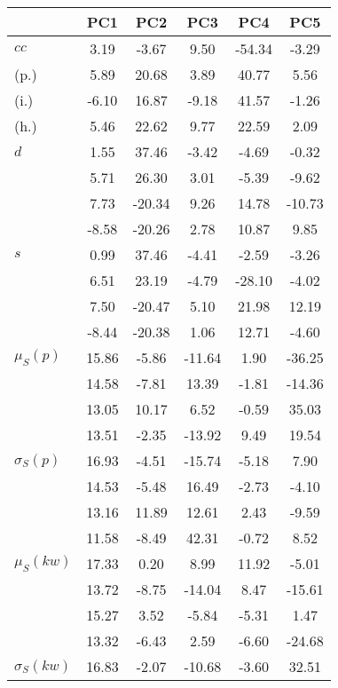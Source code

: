 \begin{table}[h!]
\begin{center}
\begin{tabular}{| l | c | c | c | c | c |}\hline
 & PC1 & PC2 & PC3 & PC4 & PC5 \\\hline
$cc$ & 3.19  & -3.67  & 9.50  & -54.34  & -3.29 \\\hline
(p.) & 5.89  & 20.68  & 3.89  & 40.77  & 5.56 \\\hline
(i.) & -6.10  & 16.87  & -9.18  & 41.57  & -1.26 \\\hline
(h.) & 5.46  & 22.62  & 9.77  & 22.59  & 2.09 \\\hline
$d$ & 1.55  & 37.46  & -3.42  & -4.69  & -0.32 \\\hline
 & 5.71  & 26.30  & 3.01  & -5.39  & -9.62 \\\hline
 & 7.73  & -20.34  & 9.26  & 14.78  & -10.73 \\\hline
 & -8.58  & -20.26  & 2.78  & 10.87  & 9.85 \\\hline
$s$ & 0.99  & 37.46  & -4.41  & -2.59  & -3.26 \\\hline
 & 6.51  & 23.19  & -4.79  & -28.10  & -4.02 \\\hline
 & 7.50  & -20.47  & 5.10  & 21.98  & 12.19 \\\hline
 & -8.44  & -20.38  & 1.06  & 12.71  & -4.60 \\\hline
$\mu_S(p)$ & 15.86  & -5.86  & -11.64  & 1.90  & -36.25 \\\hline
 & 14.58  & -7.81  & 13.39  & -1.81  & -14.36 \\\hline
 & 13.05  & 10.17  & 6.52  & -0.59  & 35.03 \\\hline
 & 13.51  & -2.35  & -13.92  & 9.49  & 19.54 \\\hline
$\sigma_S(p)$ & 16.93  & -4.51  & -15.74  & -5.18  & 7.90 \\\hline
 & 14.53  & -5.48  & 16.49  & -2.73  & -4.10 \\\hline
 & 13.16  & 11.89  & 12.61  & 2.43  & -9.59 \\\hline
 & 11.58  & -8.49  & 42.31  & -0.72  & 8.52 \\\hline
$\mu_S(kw)$ & 17.33  & 0.20  & 8.99  & 11.92  & -5.01 \\\hline
 & 13.72  & -8.75  & -14.04  & 8.47  & -15.61 \\\hline
 & 15.27  & 3.52  & -5.84  & -5.31  & 1.47 \\\hline
 & 13.32  & -6.43  & 2.59  & -6.60  & -24.68 \\\hline
$\sigma_S(kw)$ & 16.83  & -2.07  & -10.68  & -3.60  & 32.51 \\\hline

\end{tabular}
\end{center}
\end{table}
